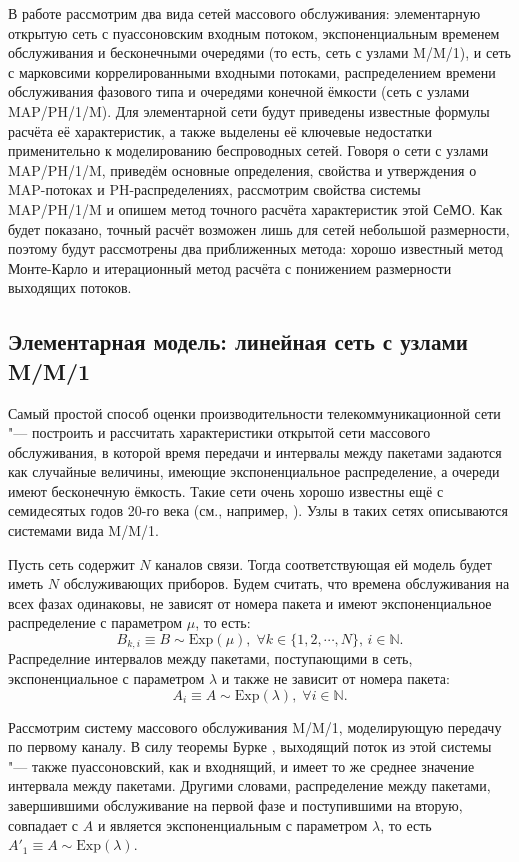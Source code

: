 В работе рассмотрим два вида сетей массового обслуживания: элементарную открытую сеть с пуассоновским входным потоком, экспоненциальным временем обслуживания и бесконечными очередями (то есть, сеть с узлами M/M/1), и сеть с марковсими коррелированными входными потоками, распределением времени обслуживания фазового типа и очередями конечной ёмкости (сеть с узлами MAP/PH/1/M). Для элементарной сети будут приведены известные формулы расчёта её характеристик, а также выделены её ключевые недостатки применительно к моделированию беспроводных сетей. Говоря о сети с узлами MAP/PH/1/M, приведём основные определения, свойства и утверждения о MAP-потоках и PH-распределениях, рассмотрим свойства системы MAP/PH/1/M и опишем метод точного расчёта характеристик этой СеМО. Как будет показано, точный расчёт возможен лишь для сетей небольшой размерности, поэтому будут рассмотрены два приближенных метода: хорошо известный метод Монте-Карло и итерационный метод расчёта с понижением размерности выходящих потоков.



\subsection{Элементарная модель: линейная сеть с узлами M/M/1}\label{sec:ch4_mm1_network}
Самый простой способ оценки производительности телекоммуникационной сети "--- построить и рассчитать характеристики открытой сети массового обслуживания, в которой время передачи и интервалы между пакетами задаются как случайные величины, имеющие экспоненциальное распределение, а очереди имеют бесконечную ёмкость. Такие сети очень хорошо известны ещё с семидесятых годов 20-го века (см., например, \cite{Kleinrock1970}). Узлы в таких сетях описываются системами вида M/M/1.

Пусть сеть содержит $N$ каналов связи. Тогда соответствующая ей модель будет иметь $N$ обслуживающих приборов. Будем считать, что времена обслуживания на всех фазах одинаковы, не зависят от номера пакета и имеют экспоненциальное распределение с параметром $\mu$, то есть:
$$
B_{k,i} \equiv B \sim \text{Exp}(\mu), \; \forall k \in \{1, 2, \cdots, N\},\, i \in \mathbb{N}.
$$
Распределние интервалов между пакетами, поступающими в сеть, экспоненциальное с параметром $\lambda$ и также не зависит от номера пакета:
$$
A_i \equiv A \sim \text{Exp}(\lambda), \; \forall i \in \mathbb{N}.
$$

Рассмотрим систему массового обслуживания M/M/1, моделирующую передачу по первому каналу. В силу теоремы Бурке \cite{Burke1956}, выходящий поток из этой системы "--- также пуассоновский, как и входнящий, и имеет то же среднее значение интервала между пакетами. Другими словами, распределение между пакетами, завершившими обслуживание на первой фазе и поступившими на вторую, совпадает с $A$ и является экспоненциальным с параметром $\lambda$, то есть $A'_1 \equiv A \sim \text{Exp}(\lambda)$.

